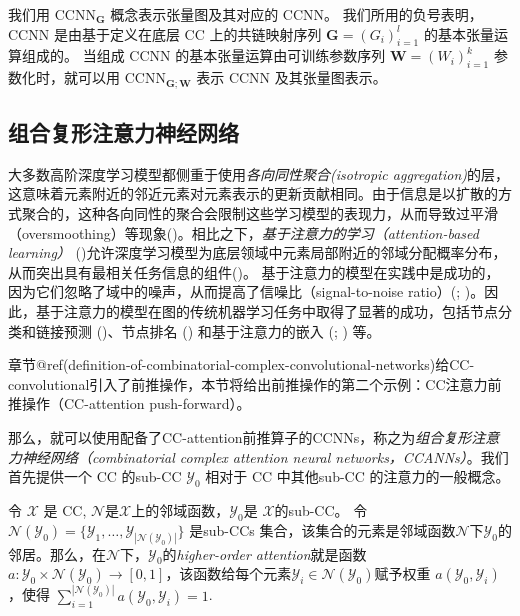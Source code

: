 \documentclass[
  12pt,
]{krantz}
\begin{document}
我们用 \(\mbox{CCNN}_{\mathbf{G}}\) 概念表示张量图及其对应的 CCNN。
我们所用的负号表明，CCNN 是由基于定义在底层 CC 上的共链映射序列
\(\mathbf{G}= (G_i)_{i=1}^l\) 的基本张量运算组成的。 当组成 CCNN
的基本张量运算由可训练参数序列 \(\mathbf{W}= (W_i)_{i=1}^k\)
参数化时，就可以用 \(\mbox{CCNN}_{\mathbf{G};\mathbf{W}}\) 表示 CCNN
及其张量图表示。

\subsection{组合复形注意力神经网络}\label{combinatorial-complex-attention-neural-networks}

大多数高阶深度学习模型都侧重于使用\emph{各向同性聚合(isotropic
aggregation)}的层，这意味着元素附近的邻近元素对元素表示的更新贡献相同。由于信息是以扩散的方式聚合的，这种各向同性的聚合会限制这些学习模型的表现力，从而导致过平滑（oversmoothing）等现象()。相比之下，\emph{基于注意力的学习（attention-based
learning）} ()允许深度学习模型为底层领域中元素局部附近的邻域分配概率分布，从而突出具有最相关任务信息的组件()。
基于注意力的模型在实践中是成功的，因为它们忽略了域中的噪声，从而提高了信噪比（signal-to-noise
ratio）(;
)。因此，基于注意力的模型在图的传统机器学习任务中取得了显著的成功，包括节点分类和链接预测
()、节点排名
() 和基于注意力的嵌入
(;
) 等。

章节@ref(definition-of-combinatorial-complex-convolutional-networks)给CC-convolutional引入了前推操作，本节将给出前推操作的第二个示例：CC注意力前推操作（CC-attention
push-forward）。

那么，就可以使用配备了CC-attention前推算子的CCNNs，称之为\emph{组合复形注意力神经网络（combinatorial
complex attention neural networks，CCANNs）}。我们首先提供一个 CC
的sub-CC \(\mathcal{Y}_0\) 相对于 CC 中其他sub-CC 的注意力的一般概念。

\label{hoa}
令 \(\mathcal{X}\) 是 CC,
\(\mathcal{N}\)是\(\mathcal{X}\)上的邻域函数，\(\mathcal{Y}_0\)是
\(\mathcal{X}\)的sub-CC。 令
\(\mathcal{N}(\mathcal{Y}_0)=\{ \mathcal{Y}_1,\ldots, \mathcal{Y}_{|\mathcal{N}(\mathcal{Y}_0)|} \}\)
是sub-CCs
集合，该集合的元素是邻域函数\(\mathcal{N}\)下\(\mathcal{Y}_0\)的邻居。那么，在\(\mathcal{N}\)下，\(\mathcal{Y}_0\)的\emph{higher-order
attention}就是函数
\(a\colon {\mathcal{Y}_0}\times \mathcal{N}(\mathcal{Y}_0)\to [0,1]\)，该函数给每个元素\(\mathcal{Y}_i\in\mathcal{N}(\mathcal{Y}_0)\)赋予权重
\(a(\mathcal{Y}_0, \mathcal{Y}_i)\)，使得
\(\sum_{i=1}^{| \mathcal{N}(\mathcal{Y}_0)|} a(\mathcal{Y}_0,\mathcal{Y}_i)=1\).
\end{document}
